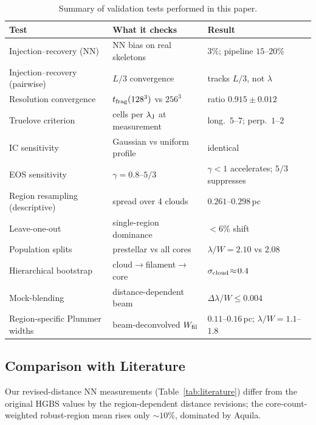 \documentclass[usenatbib,twoside,twocolumn]{mnras}
\begin{document}
\begin{table}
\caption{Summary of validation tests performed in this paper.}
\label{tab:validation_summary}
\footnotesize
\setlength{\tabcolsep}{3pt}
\begin{tabular}{p{2.4cm}p{2.8cm}p{2.0cm}}
\toprule
Test & What it checks & Result \\
\midrule
Injection--recovery (NN) & NN bias on real skeletons & $3\%$; pipeline $15$--$20\%$ \\
Injection--recovery (pairwise) & $L/3$ convergence & tracks $L/3$, not $\lambda$ \\
Resolution convergence & $t_{\rm frag}(128^3)$ vs $256^3$ & ratio $0.915\pm0.012$ \\
Truelove criterion & cells per $\lambda_{\rm J}$ at measurement & long.\ $5$--$7$; perp.\ $1$--$2$ \\
IC sensitivity & Gaussian vs uniform profile & identical \\
EOS sensitivity & $\gamma=0.8$--$5/3$ & $\gamma<1$ accelerates; $5/3$ suppresses \\
Region resampling (descriptive) & spread over 4 clouds & $0.261$--$0.298$\,pc \\
Leave-one-out & single-region dominance & $<6\%$ shift \\
Population splits & prestellar vs all cores & $\lambda/W\!=\!2.10$ vs $2.08$ \\
Hierarchical bootstrap & cloud$\to$filament$\to$core & $\sigma_{\rm cloud}\!\approx\!0.4$ \\
Mock-blending & distance-dependent beam & $\Delta\lambda/W\!\le\!0.004$ \\
Region-specific Plummer widths & beam-deconvolved $W_{\rm fil}$ & $0.11$--$0.16$\,pc; $\lambda/W\!=\!1.1$--$1.8$ \\
\bottomrule
\end{tabular}
\end{table}

\subsection{Comparison with Literature}

Our revised-distance NN measurements (Table~\ref{tab:literature}) differ from the original HGBS values by the region-dependent distance revisions; the core-count-weighted robust-region mean rises only $\sim10\%$, dominated by Aquila.
\end{document}
